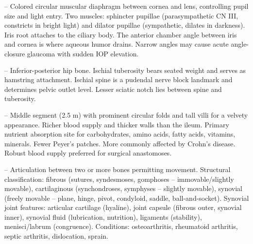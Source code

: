 -- Colored circular muscular diaphragm between cornea and lens, controlling pupil size and light entry. Two muscles: sphincter pupillae (parasympathetic CN III, constricts in bright light) and dilator pupillae (sympathetic, dilates in darkness). Iris root attaches to the ciliary body. The anterior chamber angle between iris and cornea is where aqueous humor drains. Narrow angles may cause acute angle-closure glaucoma with sudden IOP elevation.

-- Inferior-posterior hip bone. Ischial tuberosity bears seated weight and serves as hamstring attachment. Ischial spine is a pudendal nerve block landmark and determines pelvic outlet level. Lesser sciatic notch lies between spine and tuberosity.

-- Middle segment (2.5 m) with prominent circular folds and tall villi for a velvety appearance. Richer blood supply and thicker walls than the ileum. Primary nutrient absorption site for carbohydrates, amino acids, fatty acids, vitamins, minerals. Fewer Peyer's patches. More commonly affected by Crohn's disease. Robust blood supply preferred for surgical anastomoses.

-- Articulation between two or more bones permitting movement. Structural classification: fibrous (sutures, syndesmoses, gomphoses -- immovable/slightly movable), cartilaginous (synchondroses, symphyses -- slightly movable), synovial (freely movable -- plane, hinge, pivot, condyloid, saddle, ball-and-socket). Synovial joint features: articular cartilage (hyaline), joint capsule (fibrous outer, synovial inner), synovial fluid (lubrication, nutrition), ligaments (stability), menisci/labrum (congruence). Conditions: osteoarthritis, rheumatoid arthritis, septic arthritis, dislocation, sprain.

